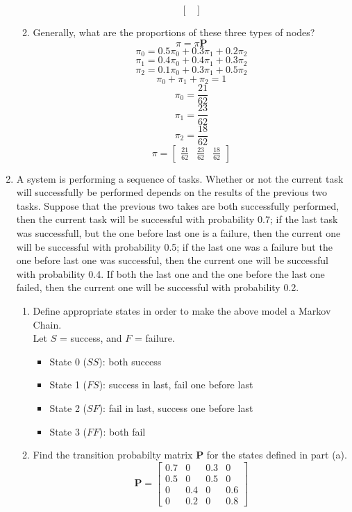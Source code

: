 \documentclass[10.5pt,letterpaper]{article}
\begin{document}
\begin{enumerate}[label=\textbf{Problem \arabic*.}]
\begin{enumerate}[label=\alph*)]
\[{\begin{bmatrix}
	\end{bmatrix}}\]
	\item Generally, what are the proportions of these three types of nodes?
	\[\pi = \pi \textbf{P}\]
	\[\pi_0 = 0.5\pi_0 + 0.3\pi_1 + 0.2\pi_2\]
	\[\pi_1 = 0.4\pi_0 + 0.4\pi_1 + 0.3\pi_2\]
	\[\pi_2 = 0.1\pi_0 + 0.3\pi_1 + 0.5\pi_2\]
	\[\pi_0 + \pi_1 + \pi_2 = 1\]
	\[\pi_0 = \frac{21}{62}\]
	\[\pi_1 = \frac{23}{62}\]
	\[\pi_2 = \frac{18}{62}\]
	\[\boxed{\pi = \begin{bmatrix}\frac{21}{62} & \frac{23}{62} & \frac{18}{62}\end{bmatrix}}\]
	\end{enumerate}
\item A system is performing a sequence of tasks. Whether or not the current task will successfully be performed depends on the results of the previous two tasks. Suppose that the previous two takes are both successfully performed, then the current task will be successful with probability 0.7; if the last task was successfull, but the one before last one is a failure, then the current one will be successful with probability 0.5; if the last one was a failure but the one before last one was successful, then the current one will be successful with probability 0.4. If both the last one and the one before the last one failed, then the current one will be successful with probability 0.2.
	\begin{enumerate}[label=\alph*)]
	\item Define appropriate states in order to make the above model a Markov Chain.\\
	Let $S$ = success, and $F$ = failure.
		\begin{itemize}
			\item State 0 ($SS$): both success
			\item State 1 ($FS$): success in last, fail one before last
			\item State 2 ($SF$): fail in last, success one before last
			\item State 3 ($FF$): both fail
		\end{itemize}
	\item Find the transition probabilty matrix \textbf{P} for the states defined in part (a).
	\[\boxed{\textbf{P} = \begin{bmatrix}
	0.7 & 0 & 0.3 & 0 \\
	0.5 & 0 & 0.5 & 0 \\
	0 & 0.4 & 0 & 0.6 \\
	0 & 0.2 & 0 & 0.8
	\end{bmatrix}}\]

\end{enumerate}
\end{enumerate}
\end{document}
